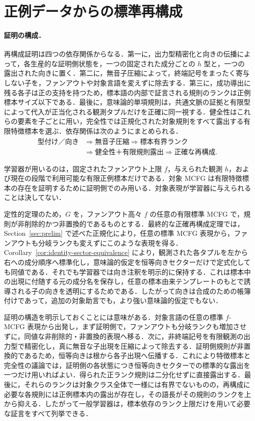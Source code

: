 \documentclass[11pt,a4paper]{ltjsarticle}
\numberwithin{equation}{section}
\theoremstyle{plain}
\theoremstyle{definition}
\theoremstyle{remark}
\begin{document}
\section{正例データからの標準再構成}
\label{sec:learner}

\paragraph{証明の構成．}
再構成証明は四つの依存関係からなる．第一に，出力型精密化と向きの伝播によって，各生産的な証明側状態を，一つの固定された成分ごとの \(h\) 型と，一つの露出された向きに置く．第二に，無音子圧縮によって，終端記号をまったく寄与しない子を，ファンアウトや対象言語を変えずに除去する．第三に，成功導出に残る各子は正の支持を持つため，標本語の内部で証言される規則のランクは正例標本サイズ以下である．最後に，意味論的単項規則は，共通文脈の証拠と有限型によって代入が正当化される観測タプルだけを正確に同一視する．健全性はこれらの要素を子ごとに用い，完全性では正規化された対象規則をすべて露出する有限特徴標本を選ぶ．依存関係は次のようにまとめられる．
\[
\begin{aligned}
  \text{型付け／向き}
  &\Longrightarrow \text{無音子圧縮}
  \Longrightarrow \text{標本有界ランク}\\
  &\Longrightarrow \text{健全性＋有限規則露出}
  \Longrightarrow \text{正確な再構成}.
\end{aligned}
\]

学習器が用いるのは，固定されたファンアウト上限 \(f\)，与えられた観測 \(h\)，および現在の段階で利用可能な有限正例標本だけである．対象 MCFG は有限特徴標本の存在を証明するために証明側でのみ用いる．対象表現が学習器に与えられることは決してない．

定性的定理のため，\(G\) を，ファンアウト高々 \(f\) の任意の有限標準 MCFG で，規則が非削除的かつ非置換的であるものとする．最終的な正確再構成定理では，Section~\ref{sec:prelim} で述べた正規化により，任意の標準 MCFG 表現から，ファンアウトも分岐ランクも変えずにこのような表現を得る．Corollary~\ref{cor:identity-sector-equivalence} により，観測された各タプルを左から右への成分順序へ標準化し，意味論的仮定を恒等向きセクターだけで定式化しても同値である．それでも学習器では向き注釈を明示的に保持する．これは標本中の出現に付随する元の成分名を保存し，任意の標本由来テンプレートのもとで誘導される子の向きを透明にするためである．したがって向きは合成のための帳簿付けであって，追加の対象助言でも，より強い意味論的仮定でもない．

証明の構造を明示しておくことには意味がある．対象言語の任意の標準 \(f\)-MCFG 表現から出発し，まず証明側で，ファンアウトも分岐ランクも増加させずに，同値な非削除的・非置換的表現へ移る．次に，非終端記号を有限観測の出力型で精密化し，真に無音な子出現を圧縮によって除去する．証明側規則が非置換的であるため，恒等向きは根から各子出現へ伝播する．これにより特徴標本と完全性の議論では，証明側の各状態につき恒等向きセクターでの標準的な露出を一つだけ用いればよい．得られた正ランク規則は二分化せずに直接露出する．最後に，それらのランクは対象クラス全体で一様には有界でないものの，再構成に必要な各規則には正例標本内の露出が存在し，その語長がその規則のランクを上から抑える．したがって一般学習器は，標本依存のランク上限だけを用いて必要な証言をすべて列挙できる．
\end{document}
